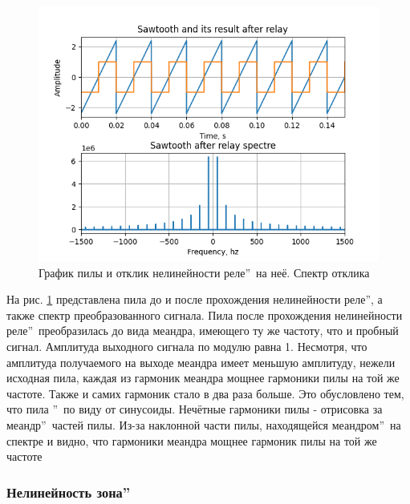 \begin{figure}[H]
	\centering
	\includegraphics[width=0.75\linewidth]{body/images/sawtooth-after-relay-and-its-spectre.png}
	\caption{График пилы и отклик нелинейности 
	 реле\textquotedblright\ на неё. Спектр отклика}
	\label{fig:15}
\end{figure}

На рис. \ref{fig:15} представлена пила до и после прохождения
нелинейности  реле\textquotedblright, а
также спектр преобразованного сигнала. Пила после прохождения нелинейности 
 реле\textquotedblright\ преобразилась
до вида меандра, имеющего ту же частоту, что и пробный сигнал.
Амплитуда выходного сигнала по модулю равна 1.
Несмотря, что амплитуда получаемого на выходе меандра имеет
меньшую амплитуду, нежели исходная пила, каждая из гармоник
меандра мощнее гармоники пилы на той же частоте. Также и самих
гармоник стало в два раза больше. Это обусловлено тем, что
пила \textquotedblright\ по виду от
синусоиды. Нечётные гармоники пилы - отрисовка 
 за меандр\textquotedblright\
частей пилы. Из-за наклонной части пилы, находящейся 
 меандром\textquotedblright\
на спектре и видно, что гармоники меандра мощнее гармоник
пилы на той же частоте

\subsubsection{Нелинейность  зона\textquotedblright}

